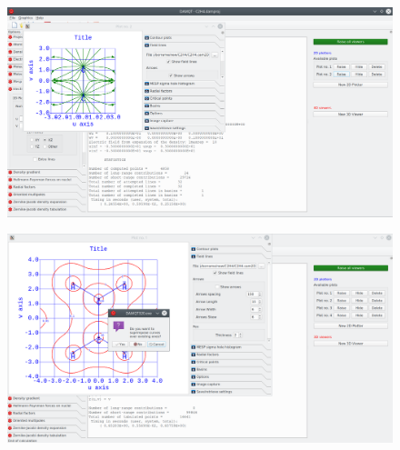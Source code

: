 \documentclass[a4paper,10pt]{article}
\begin{document}
\begin{minipage}{.5\linewidth}
\begin{figure}[H]
\caption{\label{fig:27}}
\begin{center}
\includegraphics[width=0.95\linewidth]{damqt_QS_fig27.png}
\end{center}
\end{figure} 
\end{minipage}
\begin{minipage}{.5\linewidth}
\begin{figure}[H]
\caption{\label{fig:28}}
\begin{center}
\includegraphics[width=0.95\linewidth]{damqt_QS_fig28.png}
\end{center}
\end{figure} 
\end{minipage}
\end{document}
